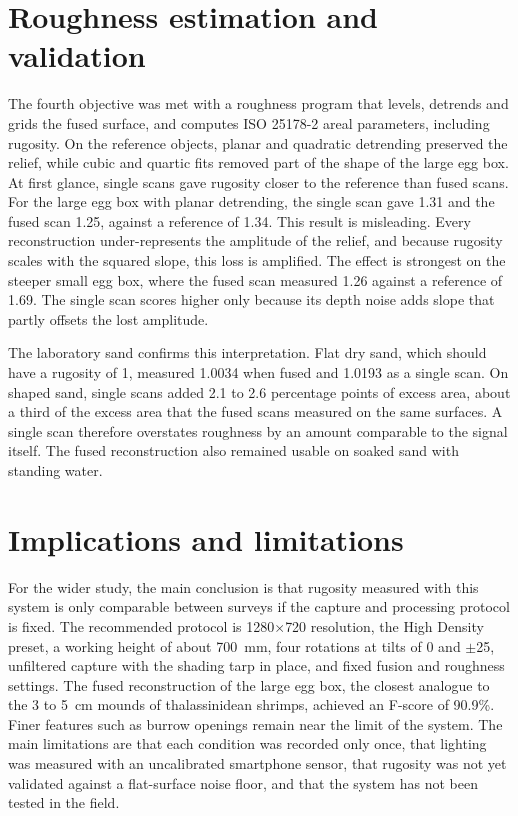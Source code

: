 \section*{Roughness estimation and validation}


The fourth objective was met with a roughness program that levels, detrends and grids the fused surface, and computes ISO 25178-2 areal parameters, including rugosity. On the reference objects, planar and quadratic detrending preserved the relief, while cubic and quartic fits removed part of the shape of the large egg box. At first glance, single scans gave rugosity closer to the reference than fused scans. For the large egg box with planar detrending, the single scan gave 1.31 and the fused scan 1.25, against a reference of 1.34. This result is misleading. Every reconstruction under-represents the amplitude of the relief, and because rugosity scales with the squared slope, this loss is amplified. The effect is strongest on the steeper small egg box, where the fused scan measured 1.26 against a reference of 1.69. The single scan scores higher only because its depth noise adds slope that partly offsets the lost amplitude.

The laboratory sand confirms this interpretation. Flat dry sand, which should have a rugosity of 1, measured 1.0034 when fused and 1.0193 as a single scan. On shaped sand, single scans added 2.1 to 2.6 percentage points of excess area, about a third of the excess area that the fused scans measured on the same surfaces. A single scan therefore overstates roughness by an amount comparable to the signal itself. The fused reconstruction also remained usable on soaked sand with standing water.

\section*{Implications and limitations}

For the wider study, the main conclusion is that rugosity measured with this system is only comparable between surveys if the capture and processing protocol is fixed. The recommended protocol is 1280$\times$720 resolution, the High Density preset, a working height of about 700~mm, four rotations at tilts of 0 and $\pm$25\textdegree{}, unfiltered capture with the shading tarp in place, and fixed fusion and roughness settings. The fused reconstruction of the large egg box, the closest analogue to the 3 to 5~cm mounds of thalassinidean shrimps, achieved an F-score of 90.9\%. Finer features such as burrow openings remain near the limit of the system. The main limitations are that each condition was recorded only once, that lighting was measured with an uncalibrated smartphone sensor, that rugosity was not yet validated against a flat-surface noise floor, and that the system has not been tested in the field. 

